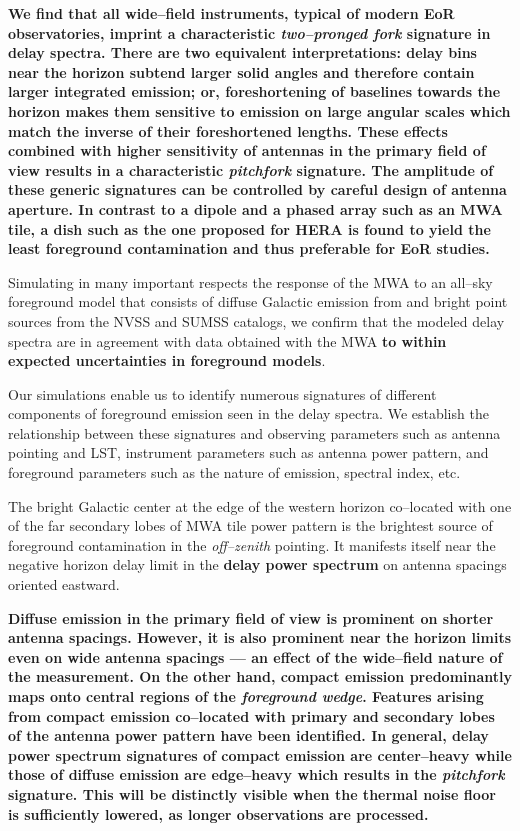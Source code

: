 \documentclass[preprint2,iop,numberedappendix,twocolappendix,appendixfloats]{emulateapj}
\begin{document}
{\bf We find that all wide--field instruments, typical of modern EoR observatories, imprint a characteristic {\it two--pronged fork} signature in delay spectra. There are two equivalent interpretations: delay bins near the horizon subtend larger solid angles and therefore contain larger integrated emission; or, foreshortening of baselines towards the horizon makes them sensitive to emission on large angular scales which match the inverse of their foreshortened lengths. These effects combined with higher sensitivity of antennas in the primary field of view results in a characteristic {\it pitchfork} signature. The amplitude of these generic signatures can be controlled by careful design of antenna aperture. In contrast to a dipole and a phased array such as an MWA tile, a dish such as the one proposed for HERA is found to yield the least foreground contamination and thus preferable for EoR studies.}

Simulating in many important respects the response of the MWA to an all--sky foreground model that consists of diffuse Galactic emission from \citet{deo08} and bright point sources from the NVSS and SUMSS catalogs, we confirm that the modeled delay spectra are in agreement with data obtained with the MWA {\bf to within expected uncertainties in foreground models}. 

Our simulations enable us to identify numerous signatures of different components of foreground emission seen in the delay spectra. We establish the relationship between these signatures and observing parameters such as antenna pointing and LST, instrument parameters such as antenna power pattern, and foreground parameters such as the nature of emission, spectral index, etc. 

The bright Galactic center at the edge of the western horizon co--located with one of the far secondary lobes of MWA tile power pattern is the brightest source of foreground contamination in the {\it off--zenith} pointing. It manifests itself near the negative horizon delay limit in the {\bf delay power spectrum} on antenna spacings oriented eastward. 

{\bf Diffuse emission in the primary field of view is prominent on shorter antenna spacings. However, it is also prominent near the horizon limits even on wide antenna spacings --- an effect of the wide--field nature of the measurement. On the other hand, compact emission predominantly maps onto central regions of the {\it foreground wedge}. Features arising from compact emission co--located with primary and secondary lobes of the antenna power pattern have been identified. In general, {\bf delay power spectrum} signatures of compact emission are center--heavy while those of diffuse emission are edge--heavy which results in the {\it pitchfork} signature. This will be distinctly visible when the thermal noise floor is sufficiently lowered, as longer observations are processed.} 
\end{document}
